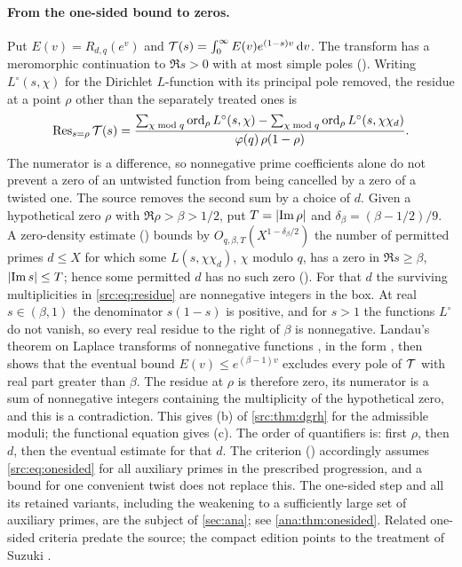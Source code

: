 \paragraph{From the one-sided bound to zeros.}
Put $E(v)=R_{d,q}(e^v)$ and $\mathcal{T}(s)=\int_0^\infty E(v)e^{(1-s)v}\,\mathrm{d} v$. The transform has
a meromorphic continuation to $\Re s>0$ with at most simple poles
(). Writing $L^\circ(s,\chi)$ for the Dirichlet $L$-function
with its principal pole removed, the residue at a point $\rho$ other than the separately
treated ones is
\begin{equation}\label{src:eq:residue}
\operatorname{Res}_{s=\rho}\mathcal{T}(s)=
\frac{\sum_{\chi\bmod q}\operatorname{ord}_\rho L^\circ(s,\chi)-\sum_{\chi\bmod q}\operatorname{ord}_\rho L^\circ(s,\chi\chi_d)}
{\varphi(q)\,\rho(1-\rho)} .
\end{equation}
The numerator is a difference, so nonnegative prime coefficients alone do not prevent a zero
of an untwisted function from being cancelled by a zero of a twisted one. The source removes
the second sum by a choice of $d$. Given a hypothetical zero $\rho$ with $\Re\rho>\beta>1/2$,
put $T=\lvert\operatorname{Im}\rho\rvert$ and $\delta_\beta=(\beta-1/2)/9$. A zero-density estimate
() bounds by $O_{q,\beta,T}(X^{1-\delta_\beta/2})$ the number of
permitted primes $d\le X$ for which some $L(s,\chi\chi_d)$, $\chi$ modulo $q$, has a zero in
$\Re s\ge\beta$, $\lvert\operatorname{Im} s\rvert\le T$; hence some permitted $d$ has no such zero
(). For that $d$ the surviving multiplicities in
\eqref{src:eq:residue} are nonnegative integers in the box. At real $s\in(\beta,1)$ the
denominator $s(1-s)$ is positive, and for $s>1$ the functions $L^\circ$ do not vanish, so
every real residue to the right of $\beta$ is nonnegative. Landau's theorem on Laplace
transforms of nonnegative functions \cite[Lemma~15.1]{MontgomeryVaughan2007Multiplicative},
in the form , then shows that the eventual bound
$E(v)\le e^{(\beta-1)v}$ excludes every pole of $\mathcal{T}$ with real part greater than $\beta$.
The residue at $\rho$ is therefore zero, its numerator is a sum of nonnegative integers
containing the multiplicity of the hypothetical zero, and this is a contradiction. This gives
(b) of \cref{src:thm:dgrh} for the admissible moduli; the functional equation gives (c). The
order of quantifiers is: first $\rho$, then $d$, then the eventual estimate for that $d$. The
criterion () accordingly assumes
\eqref{src:eq:onesided} for all auxiliary primes in the prescribed progression, and a bound
for one convenient twist does not replace this. The one-sided step and all its retained
variants, including the weakening to a sufficiently large set of auxiliary primes, are the
subject of \cref{sec:ana}; see \cref{ana:thm:onesided}. Related one-sided criteria predate the
source; the compact edition points to the treatment of Suzuki \cite{Suzuki2025Variants}.

